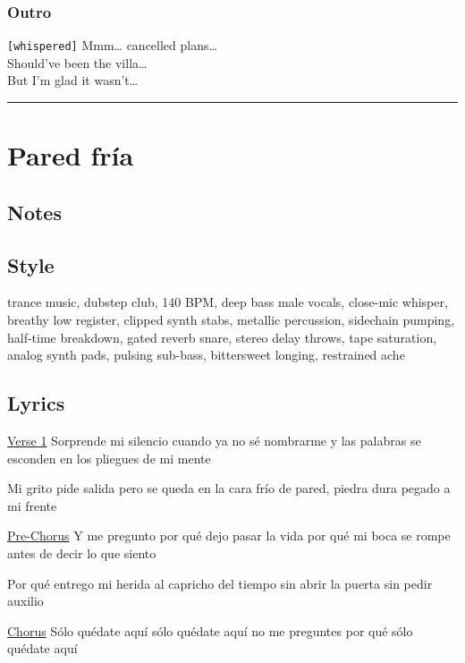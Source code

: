 \subsubsection{Outro}\label{outro-10}

\texttt{{[}whispered{]}} Mmm\ldots{} cancelled plans\ldots{}\\
Should've been the villa\ldots{}\\
But I'm glad it wasn't\ldots{}

\begin{center}\rule{0.5\linewidth}{0.5pt}\end{center}

\section{Pared fría}\label{pared-fruxeda}

\subsection{Notes}\label{notes-42}

\subsection{Style}\label{style-40}

trance music, dubstep club, 140 BPM, deep bass male vocals, close-mic
whisper, breathy low register, clipped synth stabs, metallic percussion,
sidechain pumping, half-time breakdown, gated reverb snare, stereo delay
throws, tape saturation, analog synth pads, pulsing sub-bass,
bittersweet longing, restrained ache

\subsection{Lyrics}\label{lyrics-41}

\hyperref[verse-1]{Verse 1} Sorprende mi silencio cuando ya no sé
nombrarme y las palabras se esconden en los pliegues de mi mente

Mi grito pide salida pero se queda en la cara frío de pared, piedra dura
pegado a mi frente

\hyperref[pre-chorus]{Pre-Chorus} Y me pregunto por qué dejo pasar la
vida por qué mi boca se rompe antes de decir lo que siento

Por qué entrego mi herida al capricho del tiempo sin abrir la puerta sin
pedir auxilio

\hyperref[chorus]{Chorus} Sólo quédate aquí sólo quédate aquí no me
preguntes por qué sólo quédate aquí

